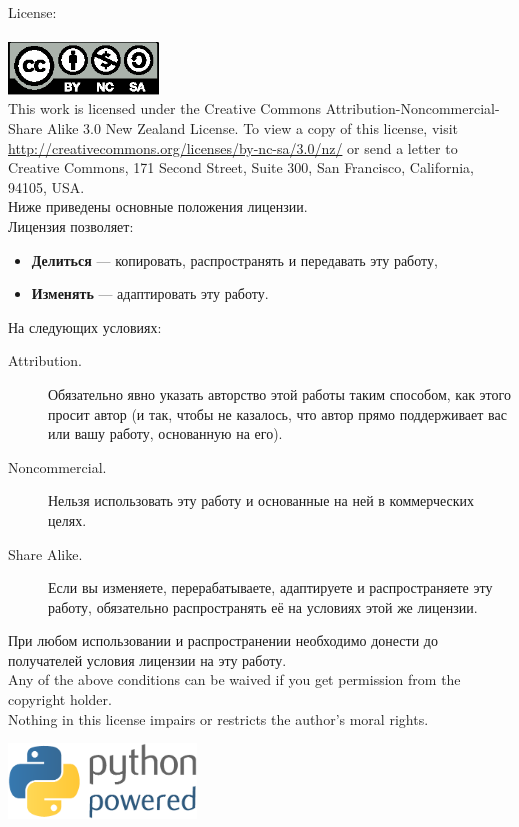 \noindent
License:\\
\\
\includegraphics[width=40mm]{../en/by-nc-sa.eps}\\
This work is licensed under the Creative Commons Attribution-Noncommercial-Share Alike 3.0 New Zealand License. To view a copy of this license, visit\\ \href{http://creativecommons.org/licenses/by-nc-sa/3.0/nz/}{http://creativecommons.org/licenses/by-nc-sa/3.0/nz/} or send a letter to Creative Commons, 171 Second Street, Suite 300, San Francisco, California, 94105, USA.\\

\noindent
Ниже приведены основные положения лицензии.\\

\noindent
Лицензия позволяет:
\begin{itemize}
 \item \textbf{Делиться} — копировать, распространять и передавать эту работу,
 \item \textbf{Изменять} — адаптировать эту работу.
\end{itemize}
\noindent
На следующих условиях:
\begin{description}
 \item[Attribution.] Обязательно явно указать авторство этой работы таким способом, как этого просит автор (и так, чтобы не казалось, что автор прямо поддерживает вас или вашу работу, основанную на его).
 \item[Noncommercial.] Нельзя использовать эту работу и основанные на ней в коммерческих целях.
 \item[Share Alike.] Если вы изменяете, перерабатываете, адаптируете и распространяете эту работу, обязательно распространять её на условиях этой же лицензии.
\end{description}

\noindent
При любом использовании и распространении необходимо донести до получателей условия лицензии на эту работу.\\

\noindent
Any of the above conditions can be waived if you get permission from the copyright holder.\\

\noindent
Nothing in this license impairs or restricts the author's moral rights.\\

\vspace*{4cm}
\begin{center}
\includegraphics[width=5cm]{../en/python-powered.eps}
\end{center}

\mainmatter

\pagestyle{plain}

\tableofcontents
